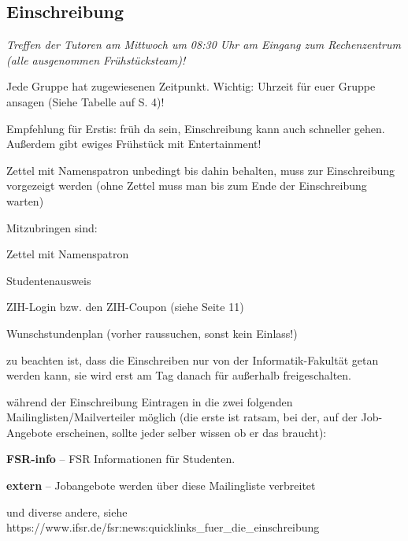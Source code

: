 \documentclass[a4paper,12pt]{report}
\begin{document}
\subsection{Einschreibung}
\begin{itemize*}
	\item \textit{Treffen der Tutoren am Mittwoch um 08:30 Uhr am Eingang zum Rechenzentrum (alle ausgenommen Frühstücksteam)!}
	\item Jede Gruppe hat zugewiesenen Zeitpunkt. Wichtig: Uhrzeit für euer Gruppe ansagen (Siehe Tabelle auf S. 4)!
	\item Empfehlung für Erstis: früh da sein, Einschreibung kann auch schneller gehen. Außerdem gibt ewiges Frühstück mit Entertainment!
	\item Zettel mit Namenspatron unbedingt bis dahin behalten, muss zur Einschreibung vorgezeigt werden (ohne Zettel muss man bis zum Ende der Einschreibung warten)
	\item Mitzubringen sind:
		\begin{itemize*}
		\item Zettel mit Namenspatron
		\item Studentenausweis
		\item ZIH-Login bzw. den ZIH-Coupon (siehe Seite 11)
		\item Wunschstundenplan (vorher raussuchen, sonst kein Einlass!)
		\item zu beachten ist, dass die Einschreiben nur von der Informatik-Fakultät getan werden kann, sie wird erst am Tag danach für außerhalb freigeschalten.
	\end{itemize*}
	\item während der Einschreibung Eintragen in die zwei folgenden Mailinglisten/Mailverteiler möglich (die erste ist ratsam, bei der, auf der Job-Angebote erscheinen, sollte jeder selber wissen ob er das braucht):
		\begin{itemize*}
		\item \textbf{FSR-info} -- FSR Informationen für Studenten.
		\item \textbf{extern} -- Jobangebote werden über diese Mailingliste verbreitet
		\item und diverse andere, siehe \\ https://www.ifsr.de/fsr:news:quicklinks\_fuer\_die\_einschreibung
	\end{itemize*}
\end{itemize*}
\end{document}
